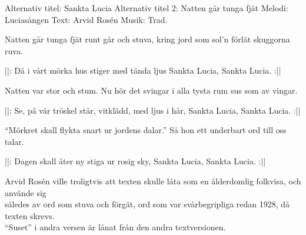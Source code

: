 \begin{song}


\begin{songmeta}
Alternativ titel: Sankta Lucia
Alternativ titel 2: Natten går tunga fjät
Melodi: Luciasången
Text: Arvid Rosén
Musik: Trad.
\end{songmeta}

\begin{songtext}
Natten går tunga fjät
runt går och stuva,
kring jord som sol'n förlät
skuggorna ruva.

||: Då i vårt mörka hus
stiger med tända ljus
Sankta Lucia,
Sankta Lucia. :||

Natten var stor och stum.
Nu hör det svingar
i alla tysta rum
sus som av vingar.

||: Se, på vår tröskel står,
vitklädd, med ljus i hår,
Sankta Lucia,
Sankta Lucia. :||

\textquotedblleft{}Mörkret skall flykta snart
ur jordens dalar.\textquotedblright{}
Så hon ett underbart
ord till oss talar.

||: Dagen skall åter ny
stiga ur rosig sky,
Sankta Lucia,
Sankta Lucia. :||
\end{songtext}

\begin{songnotes}
Arvid Rosén ville troligtvis att texten skulle låta som en ålderdomlig folkvisa, och använde sig \\ således av ord som stuva och förgät, ord som var svårbegripliga redan 1928, då texten skrevs. \\\textquotedblleft{}Suset\textquotedblright{} i andra versen är lånat från den andra textversionen.
\end{songnotes}

\end{song}
